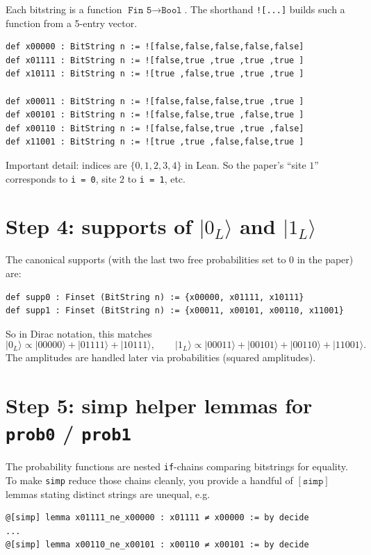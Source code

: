 \documentclass[11pt]{article}
\newcommand{\ket}[1]{\lvert #1 \rangle}
\begin{document}
Each bitstring is a function \(\texttt{Fin 5}\to\texttt{Bool}\). The shorthand \texttt{![...]} builds such a function from a 5-entry vector.

\begin{lstlisting}
def x00000 : BitString n := ![false,false,false,false,false]
def x01111 : BitString n := ![false,true ,true ,true ,true ]
def x10111 : BitString n := ![true ,false,true ,true ,true ]

def x00011 : BitString n := ![false,false,false,true ,true ]
def x00101 : BitString n := ![false,false,true ,false,true ]
def x00110 : BitString n := ![false,false,true ,true ,false]
def x11001 : BitString n := ![true ,true ,false,false,true ]
\end{lstlisting}

Important detail: indices are \(\{0,1,2,3,4\}\) in Lean.
So the paper's ``site \(1\)'' corresponds to \texttt{i = 0}, site \(2\) to \texttt{i = 1}, etc.

\section*{Step 4: supports of \(\ket{0_L}\) and \(\ket{1_L}\)}

The canonical supports (with the last two free probabilities set to 0 in the paper) are:

\begin{lstlisting}
def supp0 : Finset (BitString n) := {x00000, x01111, x10111}
def supp1 : Finset (BitString n) := {x00011, x00101, x00110, x11001}
\end{lstlisting}

So in Dirac notation, this matches
\[
\ket{0_L}\propto \ket{00000}+\ket{01111}+\ket{10111},\qquad
\ket{1_L}\propto \ket{00011}+\ket{00101}+\ket{00110}+\ket{11001}.
\]
The amplitudes are handled later via probabilities (squared amplitudes).

\section*{Step 5: simp helper lemmas for \texttt{prob0} / \texttt{prob1}}

The probability functions are nested \texttt{if}-chains comparing bitstrings for equality. To make \texttt{simp} reduce those chains cleanly, you provide a handful of \([\texttt{simp}]\) lemmas stating distinct strings are unequal, e.g.

\begin{lstlisting}
@[simp] lemma x01111_ne_x00000 : x01111 ≠ x00000 := by decide
...
@[simp] lemma x00110_ne_x00101 : x00110 ≠ x00101 := by decide
\end{lstlisting}
\end{document}
